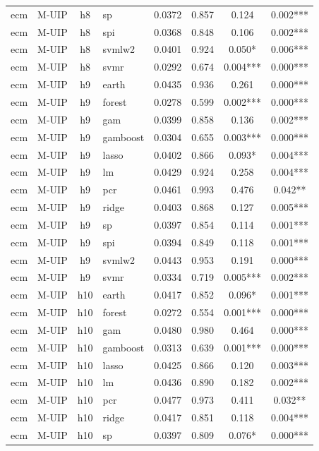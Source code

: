 \begin{ThreePartTable}
\begin{longtable}[t]{llclcccc}
ecm & M-UIP & h8 & sp & 0.0372 & 0.857 & 0.124 & 0.002***\\
ecm & M-UIP & h8 & spi & 0.0368 & 0.848 & 0.106 & 0.002***\\
ecm & M-UIP & h8 & svmlw2 & 0.0401 & 0.924 & 0.050* & 0.006***\\
ecm & M-UIP & h8 & svmr & 0.0292 & 0.674 & 0.004*** & 0.000***\\
\addlinespace
ecm & M-UIP & h9 & earth & 0.0435 & 0.936 & 0.261 & 0.000***\\
ecm & M-UIP & h9 & forest & 0.0278 & 0.599 & 0.002*** & 0.000***\\
ecm & M-UIP & h9 & gam & 0.0399 & 0.858 & 0.136 & 0.002***\\
ecm & M-UIP & h9 & gamboost & 0.0304 & 0.655 & 0.003*** & 0.000***\\
ecm & M-UIP & h9 & lasso & 0.0402 & 0.866 & 0.093* & 0.004***\\
ecm & M-UIP & h9 & lm & 0.0429 & 0.924 & 0.258 & 0.004***\\
ecm & M-UIP & h9 & pcr & 0.0461 & 0.993 & 0.476 & 0.042**\\
ecm & M-UIP & h9 & ridge & 0.0403 & 0.868 & 0.127 & 0.005***\\
ecm & M-UIP & h9 & sp & 0.0397 & 0.854 & 0.114 & 0.001***\\
ecm & M-UIP & h9 & spi & 0.0394 & 0.849 & 0.118 & 0.001***\\
ecm & M-UIP & h9 & svmlw2 & 0.0443 & 0.953 & 0.191 & 0.000***\\
ecm & M-UIP & h9 & svmr & 0.0334 & 0.719 & 0.005*** & 0.002***\\
\addlinespace
ecm & M-UIP & h10 & earth & 0.0417 & 0.852 & 0.096* & 0.001***\\
ecm & M-UIP & h10 & forest & 0.0272 & 0.554 & 0.001*** & 0.000***\\
ecm & M-UIP & h10 & gam & 0.0480 & 0.980 & 0.464 & 0.000***\\
ecm & M-UIP & h10 & gamboost & 0.0313 & 0.639 & 0.001*** & 0.000***\\
ecm & M-UIP & h10 & lasso & 0.0425 & 0.866 & 0.120 & 0.003***\\
ecm & M-UIP & h10 & lm & 0.0436 & 0.890 & 0.182 & 0.002***\\
ecm & M-UIP & h10 & pcr & 0.0477 & 0.973 & 0.411 & 0.032**\\
ecm & M-UIP & h10 & ridge & 0.0417 & 0.851 & 0.118 & 0.004***\\
ecm & M-UIP & h10 & sp & 0.0397 & 0.809 & 0.076* & 0.000***\\

\end{longtable}
\end{ThreePartTable}
